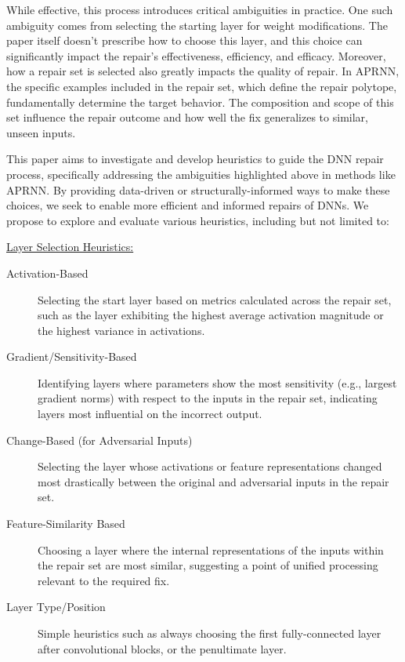 \documentclass{article}
\begin{document}
While effective, this process introduces critical ambiguities in practice. One such ambiguity comes from selecting the starting layer for weight modifications.
The paper itself doesn't prescribe how to choose this layer, and this choice can significantly impact the repair's effectiveness, efficiency, and efficacy.
Moreover, how a repair set is selected also greatly impacts the quality of repair.
In APRNN, the specific examples included in the repair set, which define the repair polytope, fundamentally determine the target behavior.
The composition and scope of this set influence the repair outcome and how well the fix generalizes to similar, unseen inputs.

This paper aims to investigate and develop heuristics to guide the DNN repair process, specifically addressing the ambiguities highlighted above in methods like APRNN. By providing data-driven or structurally-informed ways to make these choices, we seek to enable more efficient and informed repairs of DNNs.
We propose to explore and evaluate various heuristics, including but not limited to:

\underline{Layer Selection Heuristics:}
\begin{description}
    \item[Activation-Based] Selecting the start layer based on metrics calculated across the repair set, such as the layer exhibiting the highest average activation magnitude or the highest variance in activations.
    \item[Gradient/Sensitivity-Based] Identifying layers where parameters show the most sensitivity (e.g., largest gradient norms) with respect to the inputs in the repair set, indicating layers most influential on the incorrect output.
    \item[Change-Based (for Adversarial Inputs)] Selecting the layer whose activations or feature representations changed most drastically between the original and adversarial inputs in the repair set.
    \item[Feature-Similarity Based] Choosing a layer where the internal representations of the inputs within the repair set are most similar, suggesting a point of unified processing relevant to the required fix.
    \item[Layer Type/Position] Simple heuristics such as always choosing the first fully-connected layer after convolutional blocks, or the penultimate layer.
\end{description}
\end{document}

